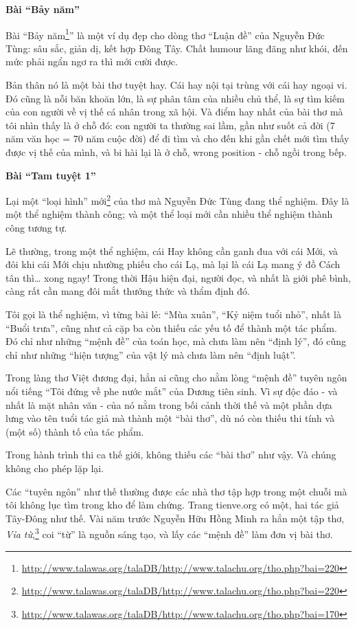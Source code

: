 \documentclass[../main.tex]{subfiles}
\begin{document}
\begin{multicols}{2}
 
\textbf{Bài “Bảy năm”} 
 
Bài “Bảy năm\footnote{\url{http://www.talawas.org/talaDB/http://www.talachu.org/tho.php?bai=220}}” là một ví dụ đẹp cho dòng thơ “Luận đề” của Nguyễn Đức Tùng: sâu sắc, giản dị, kết hợp Đông Tây. Chất humour lãng đãng như khói, đến mức phải ngẩn ngơ ra thì mới cười được. 
 
Bản thân nó là một bài thơ tuyệt hay. Cái hay nội tại trùng với cái hay ngoại vi. Đó cũng là nỗi băn khoăn lớn, là sự phân tâm của nhiều chủ thể, là sự tìm kiếm của con người về vị thế cá nhân trong xã hội. Và điểm hay nhất của bài thơ mà tôi nhìn thấy là ở chỗ đó: con người ta thường sai lầm, gần như suốt cả đời (7 năm văn học = 70 năm cuộc đời) để đi tìm và cho đến khi gần chết mới tìm thấy được vị thế của mình, và bi hài lại là ở chỗ, wrong position - chỗ ngồi trong bếp. 
 
 
\textbf{Bài “Tam tuyệt 1”} 
 
Lại một “loại hình” mới\footnote{\url{http://www.talawas.org/talaDB/http://www.talachu.org/tho.php?bai=220}} của thơ mà Nguyễn Đức Tùng đang thể nghiệm. Đây là một thể nghiệm thành công; và một thể loại mới cần nhiều thể nghiệm thành công tương tự. 
 
Lẽ thường, trong một thể nghiệm, cái Hay không cần ganh đua với cái Mới, và đôi khi cái Mới chịu nhường phiếu cho cái Lạ, mà lại là cái Lạ mang ý đồ Cách tân thì… xong ngay! Trong thời Hậu hiện đại, người đọc, và nhất là giới phê bình, càng rất cần mang đôi mắt thưởng thức và thẩm định đó. 
 
Tôi gọi là thể nghiệm, vì từng bài lẻ: “Mùa xuân”, “Kỷ niệm tuổi nhỏ”, nhất là “Buổi trưa”, cũng như cả cặp ba còn thiếu các yếu tố để thành một tác phẩm. Đó chỉ như những “mệnh đề” của toán học, mà chưa làm nên “định lý”, đó cũng chỉ như những “hiện tượng” của vật lý mà chưa làm nên “định luật”. 
 
Trong làng thơ Việt đương đại, hẳn ai cũng cho nằm lòng “mệnh đề” tuyên ngôn nổi tiếng “Tôi đứng về phe nước mắt” của Dương tiên sinh. Vì sự độc đáo - và nhất là mặt nhân văn - của nó nằm trong bối cảnh thời thế và một phần dựa lưng vào tên tuổi tác giả mà thành một “bài thơ”, dù nó còn thiếu thi tính và (một số) thành tố của tác phẩm.  
 
Trong hành trình thi ca thế giới, không thiếu các “bài thơ” như vậy. Và chúng không cho phép lặp lại.  
 
Các “tuyên ngôn” như thế thường được các nhà thơ tập hợp trong một chuỗi mà tôi không lục tìm trong kho để làm chứng. Trang tienve.org có một, hai tác giả Tây-Đông như thế. Vài năm trước Nguyễn Hữu Hồng Minh ra hẳn một tập thơ, \textit{Vỉa từ},\footnote{\url{http://www.talawas.org/talaDB/http://www.talachu.org/tho.php?bai=170}} coi “từ” là nguồn sáng tạo, và lấy các “mệnh đề” làm đơn vị bài thơ. 
 

\end{multicols}
\end{document}
